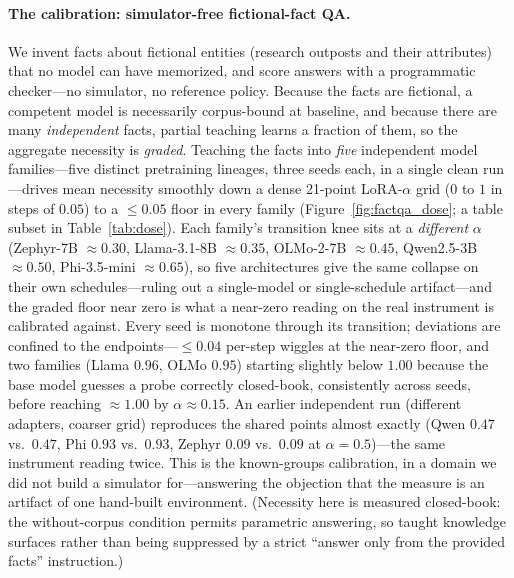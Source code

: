 \documentclass{article}
\begin{document}
\paragraph{The calibration: simulator-free fictional-fact QA.} We invent facts about fictional entities
(research outposts and their attributes) that no model can have memorized, and score answers with a
programmatic checker---no simulator, no reference policy. Because the facts are fictional, a competent
model is necessarily corpus-bound at baseline, and because there are many \emph{independent} facts,
partial teaching learns a fraction of them, so the aggregate necessity is \emph{graded}. Teaching the
facts into \emph{five} independent model families---five distinct pretraining lineages, three seeds
each, in a single clean run---drives mean necessity smoothly down a dense 21-point LoRA-$\alpha$ grid
($0$ to $1$ in steps of $0.05$) to a $\le\!0.05$ floor in every family (Figure~\ref{fig:factqa_dose};
a table subset in Table~\ref{tab:dose}). Each family's transition knee sits at a \emph{different}
$\alpha$ (Zephyr-7B $\approx\!0.30$, Llama-3.1-8B $\approx\!0.35$, OLMo-2-7B $\approx\!0.45$,
Qwen2.5-3B $\approx\!0.50$, Phi-3.5-mini $\approx\!0.65$), so five architectures give the same
collapse on their own schedules---ruling out a single-model or single-schedule artifact---and the
graded floor near zero is what a near-zero reading on the real instrument is calibrated against. Every
seed is monotone through its transition; deviations are confined to the endpoints---$\le\!0.04$
per-step wiggles at the near-zero floor, and two families (Llama $0.96$, OLMo $0.95$) starting
slightly below $1.00$ because the base model guesses a probe correctly closed-book, consistently
across seeds, before reaching $\approx\!1.00$ by $\alpha\!\approx\!0.15$. An earlier independent run
(different adapters, coarser grid) reproduces the shared points almost exactly (Qwen $0.47$ vs.\
$0.47$, Phi $0.93$ vs.\ $0.93$, Zephyr $0.09$ vs.\ $0.09$ at $\alpha{=}0.5$)---the same instrument
reading twice. This is the known-groups calibration, in a domain we did not
build a simulator for---answering the objection that the measure is an artifact of one hand-built
environment. (Necessity here is measured closed-book: the without-corpus condition permits parametric
answering, so taught knowledge surfaces rather than being suppressed by a strict ``answer only from the
provided facts'' instruction.)
\end{document}

